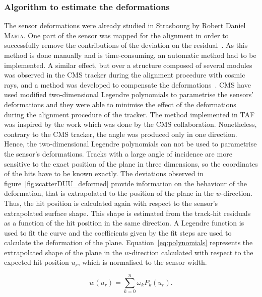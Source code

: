       \subsubsection{Algorithm to estimate the deformations}

      The sensor deformations were already studied in Strasbourg by Robert Daniel \textsc{Maria}.
      One part of the sensor was mapped for the alignment in order to successfully remove the contributions of the deviation on the residual~\cite{maria}.
      As this method is done manually and is time-consuming, an automatic method had to be implemented.
      A similar effect, but over a structure composed of several modules was observed in the CMS tracker during the alignment procedure with cosmic rays, and a method was developed to compensate the deformations~\cite{CMSalignment}. 
      CMS have used modified two-dimensional Legendre polynomials to parametrise the sensors' deformations and  they were able to minimise the effect of the deformations during the alignment procedure of the tracker.
      The method implemented in \gls{TAF} was inspired by the work which was done by the CMS collaboration.
      Nonetheless, contrary to the CMS tracker, the angle was produced only in one direction.
      Hence, the two-dimensional Legendre polynomials can not be used to parametrise the sensor's deformations.
      Tracks with a large angle of incidence are more sensitive to the exact position of the plane in three dimensions, so the coordinates of the hits have to be known exactly.
      The deviations observed in figure~\ref{fig:scatterDUU_deformed} provide information on the behaviour of the deformation, that is extrapolated to the position of the plane in the $w$-direction.
      Thus, the hit position is calculated again with respect to the sensor's extrapolated surface shape.
      This shape is estimated from the track-hit residuals as a function of the hit position in the same direction.
      A Legendre function is used to fit the curve and the coefficients given by the fit steps are used to calculate the deformation of the plane.
      Equation~\ref{eq:polynomials} represents the extrapolated shape of the plane in the $w$-direction calculated with respect to the expected hit position $u_{r}$, which is normalised to the sensor width.

      \begin{equation}
        w\left(u_{r}\right) = \sum_{k=0}^n \omega_{k}P_{k}\left(u_{r}\right).
        \label{eq:polynomials}
      \end{equation}
      
